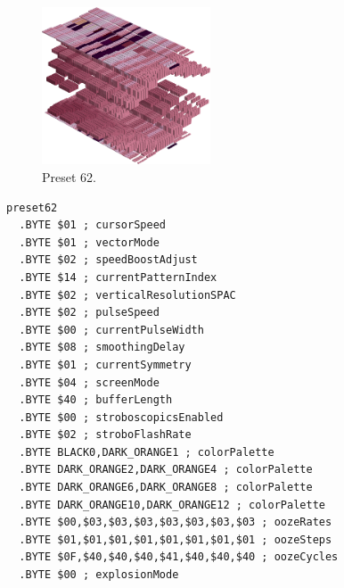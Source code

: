 \vspace*{0.5cm}
\begin{minipage}[b]{0.48\linewidth}
\begin{figure}[H]                                                          
  \centering                                                             
  \begin{adjustbox}{width=5cm,center}                                   
  \includegraphics[width=5cm]{src/colorspace_presets/preset62-45.png}%
  \end{adjustbox}                                                        
\caption*{Preset 62.}                                           
\end{figure}                                                               
\end{minipage}
\hspace{0.1cm}
\begin{minipage}[b]{0.48\linewidth}                                                                         
\begin{lstlisting}[basicstyle=\ttfamily\tiny]
preset62
  .BYTE $01 ; cursorSpeed
  .BYTE $01 ; vectorMode
  .BYTE $02 ; speedBoostAdjust
  .BYTE $14 ; currentPatternIndex
  .BYTE $02 ; verticalResolutionSPAC
  .BYTE $02 ; pulseSpeed
  .BYTE $00 ; currentPulseWidth
  .BYTE $08 ; smoothingDelay
  .BYTE $01 ; currentSymmetry
  .BYTE $04 ; screenMode
  .BYTE $40 ; bufferLength
  .BYTE $00 ; stroboscopicsEnabled
  .BYTE $02 ; stroboFlashRate
  .BYTE BLACK0,DARK_ORANGE1 ; colorPalette
  .BYTE DARK_ORANGE2,DARK_ORANGE4 ; colorPalette
  .BYTE DARK_ORANGE6,DARK_ORANGE8 ; colorPalette
  .BYTE DARK_ORANGE10,DARK_ORANGE12 ; colorPalette
  .BYTE $00,$03,$03,$03,$03,$03,$03,$03 ; oozeRates
  .BYTE $01,$01,$01,$01,$01,$01,$01,$01 ; oozeSteps
  .BYTE $0F,$40,$40,$40,$41,$40,$40,$40 ; oozeCycles
  .BYTE $00 ; explosionMode
\end{lstlisting}
\end{minipage}


